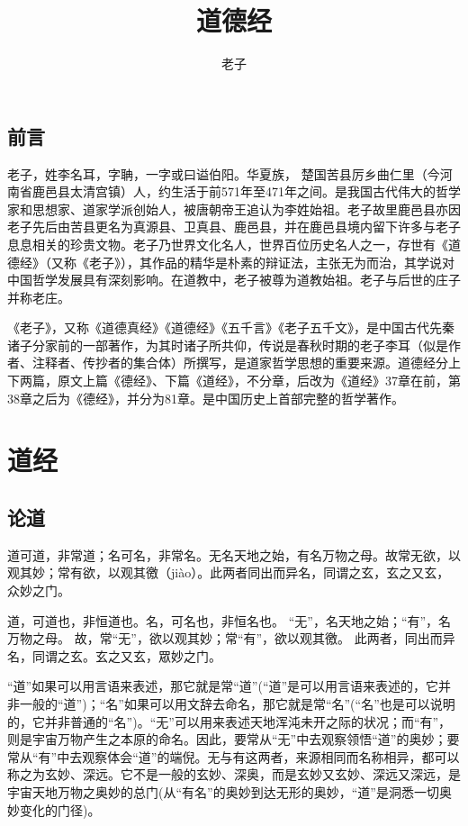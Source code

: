 \documentclass[a4paper,12pt,UTF8,twoside]{ctexbook}
\title{\heiti\zihao{0} 道德经}
\author{老子}
\date{}
\begin{document}
	\maketitle

	\tableofcontents
	
	\frontmatter
	\chapter{前言}
	
	老子，姓李名耳，字聃，一字或曰谥伯阳。华夏族， 楚国苦县厉乡曲仁里（今河南省鹿邑县太清宫镇）人，约生活于前571年至471年之间。是我国古代伟大的哲学家和思想家、道家学派创始人，被唐朝帝王追认为李姓始祖。老子故里鹿邑县亦因老子先后由苦县更名为真源县、卫真县、鹿邑县，并在鹿邑县境内留下许多与老子息息相关的珍贵文物。老子乃世界文化名人，世界百位历史名人之一，存世有《道德经》（又称《老子》），其作品的精华是朴素的辩证法，主张无为而治，其学说对中国哲学发展具有深刻影响。在道教中，老子被尊为道教始祖。老子与后世的庄子并称老庄。
	
	《老子》，又称《道德真经》《道德经》《五千言》《老子五千文》，是中国古代先秦诸子分家前的一部著作，为其时诸子所共仰，传说是春秋时期的老子李耳（似是作者、注释者、传抄者的集合体）所撰写，是道家哲学思想的重要来源。道德经分上下两篇，原文上篇《德经》、下篇《道经》，不分章，后改为《道经》37章在前，第38章之后为《德经》，并分为81章。是中国历史上首部完整的哲学著作。 
	
	\mainmatter
	
	\part{道经}
	
	\chapter{论道}
	
	道可道，非常道；名可名，非常名。无名天地之始，有名万物之母。故常无欲，以观其妙；常有欲，以观其徼（jiào）。此两者同出而异名，同谓之玄，玄之又玄，众妙之门。
	
	道，可道也，非恒道也。名，可名也，非恒名也。 “无”，名天地之始；“有”，名万物之母。 故，常“无”，欲以观其妙；常“有”，欲以观其徼。 此两者，同出而异名，同谓之玄。玄之又玄，眾妙之门。
	
	“道”如果可以用言语来表述，那它就是常“道”(“道”是可以用言语来表述的，它并非一般的“道”)；“名”如果可以用文辞去命名，那它就是常“名”(“名”也是可以说明的，它并非普通的“名”)。“无”可以用来表述天地浑沌未开之际的状况；而“有”，则是宇宙万物产生之本原的命名。因此，要常从“无”中去观察领悟“道”的奥妙；要常从“有”中去观察体会“道”的端倪。无与有这两者，来源相同而名称相异，都可以称之为玄妙、深远。它不是一般的玄妙、深奥，而是玄妙又玄妙、深远又深远，是宇宙天地万物之奥妙的总门(从“有名”的奥妙到达无形的奥妙，“道”是洞悉一切奥妙变化的门径)。
	
\end{document}
